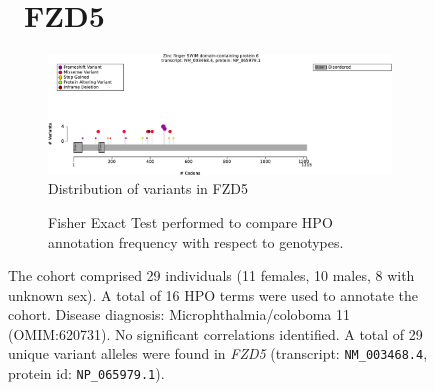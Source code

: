 \begin{figure}[htbp]
\section*{ FZD5}
\centering
\begin{subfigure}[b]{0.95\textwidth}
\centering
\includegraphics[width=\textwidth]{ img/FZD5_protein_diagram.pdf} 
\captionsetup{justification=raggedright,singlelinecheck=false}
\caption{Distribution of variants in FZD5}
\end{subfigure}

\vspace{2em}

\begin{subfigure}[b]{0.95\textwidth}
\centering
{}
\captionsetup{justification=raggedright,singlelinecheck=false}
\caption{Fisher Exact Test performed to compare HPO annotation frequency with respect to genotypes. }
\end{subfigure}

\vspace{2em}

\caption{ The cohort comprised 29 individuals (11 females, 10 males, 8 with unknown sex). A total of 16 HPO terms were used to annotate the cohort. Disease diagnosis: Microphthalmia/coloboma 11 (OMIM:620731). No significant correlations identified. A total of 29 unique variant alleles were found in \textit{FZD5} (transcript: \texttt{NM\_003468.4}, protein id: \texttt{NP\_065979.1}).}
\end{figure}
